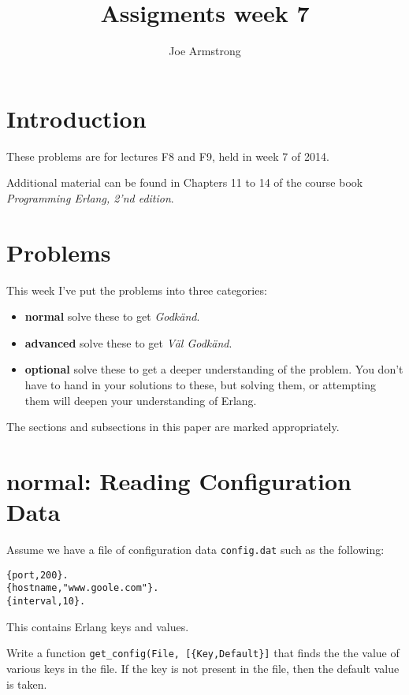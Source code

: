 \documentclass[12pt]{hitec}
\title{Assigments week 7}
\author{Joe Armstrong}
\begin{document}
\maketitle

\tableofcontents

\section{Introduction}
These problems are for lectures F8 and F9, held in week 7 of 2014.

Additional material can be found in Chapters 11 to 14 of the course book
{\sl Programming Erlang, 2'nd edition}.

\section{Problems}

This week I've put the problems into three categories:

\begin{itemize}
\item {\bf normal} solve these to get {\sl Godk\"{a}nd}.
\item {\bf advanced} solve these to get {\sl V\"{a}l Godk\"{a}nd}.
\item {\bf optional} solve these to get a deeper understanding of the problem. You don't
have to hand in your solutions to these, but solving them, or attempting them will
deepen your understanding of Erlang.
\end{itemize}

The sections and subsections in this paper are marked appropriately.

\section{normal: Reading Configuration Data}

Assume we have a file of configuration data \verb+config.dat+ such as the following:

\begin{Verbatim}[frame=single]
{port,200}.
{hostname,"www.goole.com"}.
{interval,10}.
\end{Verbatim}

This contains Erlang keys and values.

Write a function \verb+get_config(File, [{Key,Default}]+ that finds the
the value of various keys in the file. If the key is not present in the file,
then the default value is taken.
\end{document}
